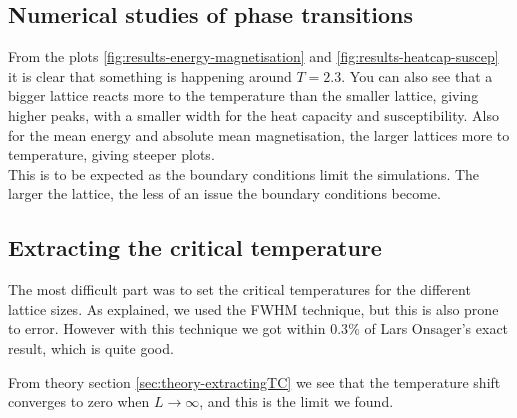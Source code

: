 \documentclass[../main.tex]{subfiles}
\begin{document}
\subsection{Numerical studies of phase transitions}
From the plots \ref{fig:results-energy-magnetisation} and \ref{fig:results-heatcap-suscep} it is clear that something is happening around $T = 2.3$. You can also see that a bigger lattice reacts more to the temperature than the smaller lattice, giving higher peaks, with a smaller width for the heat capacity and susceptibility. Also for the mean energy and absolute mean magnetisation, the larger lattices  more to temperature, giving steeper plots.\\
This is to be expected as the boundary conditions limit the simulations. The larger the lattice, the less of an issue the boundary conditions become.




\subsection{Extracting the critical temperature}
The most difficult part was to set the critical temperatures for the different lattice sizes. As explained, we used the FWHM technique, but this is also prone to error. However with this technique we got within $0.3\%$ of Lars Onsager's exact result, which is quite good.

From theory section \ref{sec:theory-extractingTC} we see that the temperature shift converges to zero when $L \rightarrow \infty$, and this is the limit we found.
\end{document}
